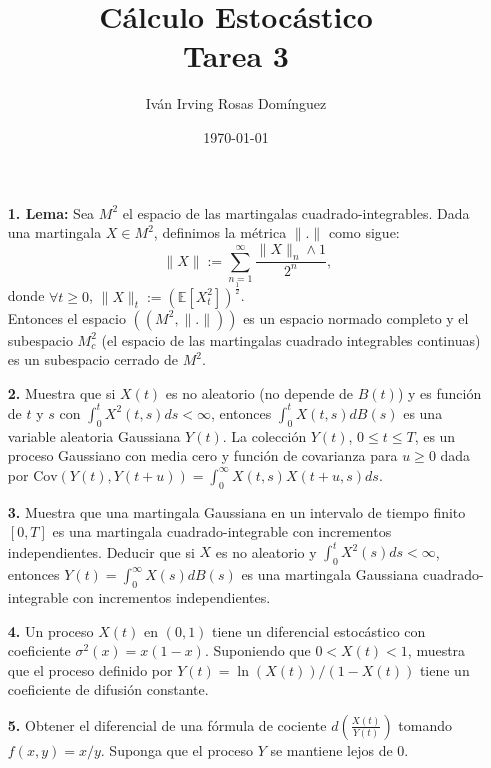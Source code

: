 \documentclass[letterpaper]{article}
\title{\textbf{Cálculo Estocástico\\
Tarea 3}}
\author{Iván Irving Rosas Domínguez}
\date{\today}
\newcommand{\E}{\mathbb{E}}
\newcommand{\1}{\mathds{1}}
\theoremstyle{definition}
\theoremstyle{definition}
\theoremstyle{definition}
\theoremstyle{definition}
\theoremstyle{definition}
\begin{document}
\maketitle

\begin{enumerate}
    \item[\textbf{1. Lema:}] Sea $M^2$ el espacio de las martingalas cuadrado-integrables. Dada una martingala $X\in M^2$, definimos la métrica $\|.\|$ como sigue: 
    \[
        \|X\|:=\sum_{n=1}^{\infty} \frac{\|X\|_n\wedge1}{2^n},
    \]
    donde $\forall t\geq0$, $\|X\|_t:=\left(\E\left[X_t^2\right]\right)^{\frac{1}{2}}$.\\
    
    Entonces el espacio $\left((M^2,\|.\|)\right)$ es un espacio normado completo y el subespacio $M^2_c$ (el espacio de las martingalas cuadrado integrables continuas)
    es un subespacio cerrado de $M^2$.\\

    \item[\textbf{2.}] Muestra que si $X(t)$ es no aleatorio (no depende de $B(t)$) y es 
    función de $t$ y $s$ con $\int_{0}^{t}X^2(t,s)ds<\infty$, entonces $\int_{0}^{t}X(t,s)dB(s)$
    es una variable aleatoria Gaussiana $Y(t)$. La colección $Y(t)$, $0\leq t \leq T$, es
    un proceso Gaussiano con media cero y función de covarianza para $u\geq0$ dada por 
    $\text{Cov}\left(Y(t),Y(t+u)\right)=\int_{0}^{\infty}X(t,s)X(t+u,s)ds.$\\

    \item[\textbf{3.}] Muestra que una martingala Gaussiana en un intervalo de tiempo
    finito $[0,T]$ es una martingala cuadrado-integrable con incrementos independientes.
    Deducir que si $X$ es no aleatorio y $\int_{0}^{t}X^2(s)ds<\infty$, entonces $Y(t)=
    \int_{0}^{\infty}X(s)dB(s)$ es una martingala Gaussiana cuadrado-integrable con 
    incrementos independientes.\\

    \item[\textbf{4.}] Un proceso $X(t)$ en $(0,1)$ tiene un diferencial estocástico 
    con coeficiente $\sigma^2(x)=x(1-x)$. Suponiendo que $0<X(t)<1$, muestra que 
    el proceso definido por $Y(t)=\ln(X(t))/(1-X(t))$ tiene un coeficiente de 
    difusión constante.\\

    \item[\textbf{5.}] Obtener el diferencial de una fórmula de cociente $d \left(\frac{X(t)}{Y(t)}\right)$ 
    tomando $f(x,y)=x/y$. Suponga que el proceso $Y$ se mantiene lejos de 0.
\end{enumerate}
\end{document}
